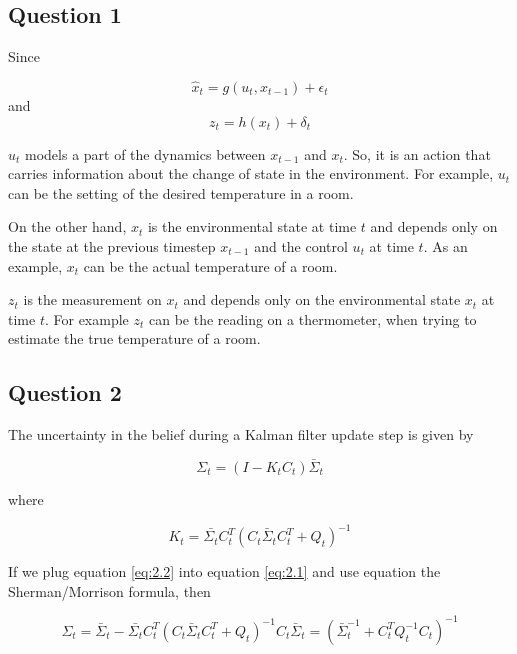\subsection{Question 1}

	Since 

	\begin{equation}
		\hat{x}_t = g(u_t, x_{t-1}) + \epsilon_t
	\end{equation}
	and
	\begin{equation}
		z_t = h(x_t) + \delta_t
	\end{equation}
	
	$u_t$ models a part of the dynamics between $x_{t-1}$ and $x_t$. So, it is an action that carries information about the 
	change of state in the environment.
	For example, $u_t$ can be the setting of the desired temperature in a room.
		
	On the other hand, $x_t$ is the environmental state at time $t$ and depends only on the state at the previous timestep $x_{t-1}$ and
	the control $u_t$ at time $t$. As an example, $x_t$ can be the actual temperature of a room.
	
	$z_t$ is the measurement on $x_t$ and depends only on the environmental state $x_t$ at time $t$. 
	For example $z_t$ can be the reading on a thermometer, when trying to estimate the true temperature of a room.
	
	
\subsection{Question 2}

	The uncertainty in the belief during a Kalman filter update step is given by
	
	\begin{equation}
		\Sigma_t = (I-K_t C_t) \bar{\Sigma}_t
		\label{eq:2.1}
	\end{equation}
	
	where
	
	\begin{equation}
		K_t = \bar{\Sigma_t} C_t^T (C_t \bar{\Sigma}_t C_t^T + Q_t)^{-1}
		\label{eq:2.2}
	\end{equation}
	
	
	If we plug equation \ref{eq:2.2} into equation \ref{eq:2.1} and use equation the Sherman/Morrison formula, then
	
	\begin{equation}
		\Sigma_t = \bar{\Sigma}_t-\bar{\Sigma_t} C_t^T (C_t \bar{\Sigma}_t C_t^T + Q_t)^{-1} C_t \bar{\Sigma}_t =
			(\bar{\Sigma}_t^{-1} + C_t^T Q_t^{-1}C_t)^{-1}
	\end{equation}
	
